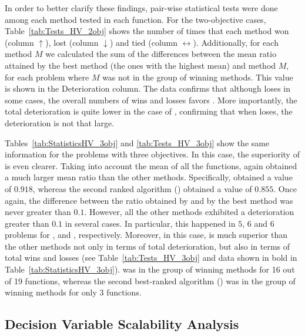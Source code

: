 


In order to better clarify these findings, pair-wise statistical tests were done among each method tested in each
function.
%
For the two-objective cases, Table~\ref{tab:Tests_HV_2obj} shows the number of times that each method won (column $\uparrow$),
lost (column $\downarrow$) and tied (column $\leftrightarrow$).
%
Additionally, for each method $M$ we calculated the sum of the differences between the mean \HV{} ratio attained by the best method 
(the ones with the highest mean) and method $M$, for each problem where $M$ was not in the group of winning methods.
%
This value is shown in the Deterioration column.
%
The data confirms that although \VSDMOEA{} loses in some cases, the overall numbers of wins and losses
favors \VSDMOEA{}.
%
More importantly, the total deterioration is quite lower in the case of \VSDMOEA{}, confirming that when \VSDMOEA{} loses, the deterioration is not 
that large.


Tables~\ref{tab:StatisticsHV_3obj} and \ref{tab:Tests_HV_3obj} show the same information for the problems with three objectives.
%
In this case, the superiority of \VSDMOEA{} is even clearer.
%
Taking into account the mean of all the functions, \VSDMOEA{} again obtained a much larger mean \HV{} ratio than the other methods.
%
Specifically, \VSDMOEA{} obtained a value of $0.918$, whereas the second ranked algorithm (\RMOEA{}) obtained a value of $0.855$.
%
Once again, the difference between the \HV{} ratio obtained by \VSDMOEA{} and by the best method was never greater
than $0.1$.
%
However, all the other methods exhibited a deterioration greater than $0.1$ in several cases.
%
In particular, this happened in $5$, $6$ and $6$ problems for \RMOEA{}, \NSGAII{} and \MOEAD{}, respectively.
%
Moreover, in this case, \VSDMOEA{} is much superior than the other methods not only in terms of total deterioration, but also
in terms of total wins and losses  (see Table~\ref{tab:Tests_HV_3obj} and data shown in bold in Table~\ref{tab:StatisticsHV_3obj}).
%
\VSDMOEA{} was in the group of winning methods for 16 out of 19 functions, whereas the second best-ranked algorithm (\RMOEA{})
was in the group of winning methods for only 3 functions.

\subsection{Decision Variable Scalability Analysis}

